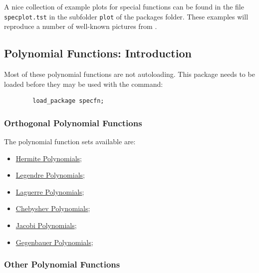 A nice collection of example plots for special functions can be found
in the file \texttt{specplot.tst} in the subfolder \texttt{plot} of the
packages folder. These examples will reproduce a number of well-known
pictures from \cite{AbramowitzStegun:72}.

\subsection{Polynomial Functions: Introduction}
Most of these polynomial functions are not  autoloading. This package needs
to be loaded before they may be used with the command:
\begin{verbatim}
        load_package specfn;
\end{verbatim}

\subsubsection{Orthogonal Polynomial Functions}

The polynomial function sets available are:
\begin{itemize}
\item \hyperlink{operator:HERMITEP}{Hermite Polynomials};
\item \hyperlink{operator:LEGENDREP}{Legendre Polynomials};
\item \hyperlink{operator:LAGUERREP}{Laguerre Polynomials};
\item \hyperlink{operator:CHEBYSHEVT}{Chebyshev Polynomials};
\item \hyperlink{operator:JACOBIP}{Jacobi Polynomials};
\item \hyperlink{operator:GEGENBAUERP}{Gegenbauer Polynomials};
\end{itemize}

\subsubsection{Other Polynomial Functions}

